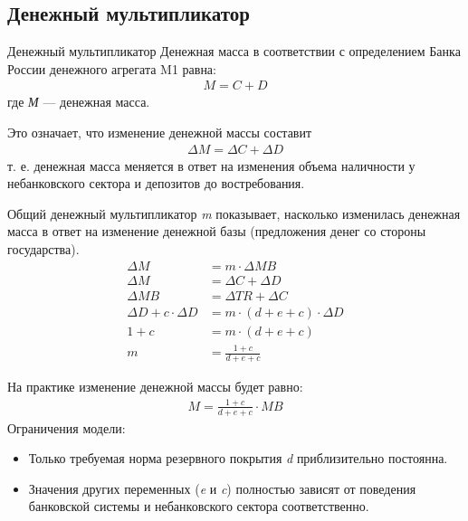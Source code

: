 \documentclass[_DKB_p1_Money.tex]{subfiles}
\begin{document}
\subsection{Денежный мультипликатор}
\begin{frame}[allowframebreaks]{Денежный мультипликатор}
Денежная масса в соответствии с определением Банка России денежного агрегата M1 равна:
\begin{align}
M=C+D
\end{align}
где \textit{М} — денежная масса. 

Это означает, что изменение денежной массы составит 
\begin{align}
\Delta M=\Delta C + \Delta D
\end{align}
т. е. денежная масса меняется в ответ на изменения объема наличности у небанковского сектора и депозитов до востребования.

\pagebreak
Общий денежный мультипликатор \textit{m} показывает, насколько изменилась денежная масса в ответ на изменение денежной базы (предложения денег со стороны государства).
\begin{align}
\Delta M &= m \cdot \Delta MB \nonumber\\
\Delta M &= \Delta C + \Delta D \nonumber\\
\Delta MB &= \Delta TR + \Delta C \nonumber\\
\Delta D + c\cdot \Delta D &= m \cdot (d+e+c)\cdot \Delta D \nonumber\\
1+c &= m \cdot (d+e+c)\nonumber \nonumber \\
m &=\frac{1+c}{d+e+c}
\end{align}

\pagebreak
На практике изменение денежной массы будет равно:
\begin{align}
M=\frac{1+c}{d+e+c}\cdot MB
\end{align}
Ограничения модели:
\begin{itemize}
\item
Только требуемая норма резервного покрытия \textit{d} приблизительно постоянна.
\item
Значения других переменных (\textit{e} и \textit{c}) полностью зависят от поведения банковской системы и небанковского сектора соответственно.
\end{itemize}

\end{frame}
\end{document}
